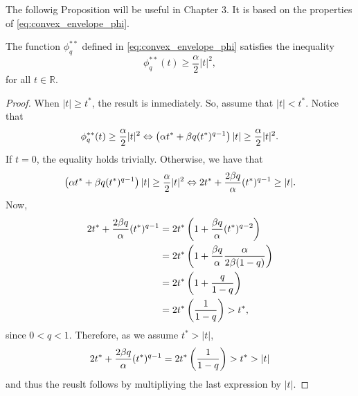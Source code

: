 The followig Proposition will be useful in Chapter 3. It is based on the properties of 
\eqref{eq:convex_envelope_phi}.
\begin{proposition}
    \label{prop:phi**_quadrature}
    The function $\phi_q^{**}$ defined in \eqref{eq:convex_envelope_phi} satisfies the inequality
    \[
    \phi_q^{**}(t)\ge \frac{\alpha}{2}|t|^2,
    \]
    for all $t\in \mathbb{R}$.
\end{proposition}
\begin{proof}
    When $|t|\ge t^*$, the result is inmediately. So, assume that $|t|<t^*$. Notice that
    \[
    \phi_{q}^{**}(t)\ge \frac{\alpha}{2}|t|^2\Leftrightarrow \left(\alpha t^*+\beta q (t^*)^{q-1}\right)|t|\ge \frac{\alpha}{2}|t|^2.
    \] 
    If $t=0$, the equality holds trivially. Otherwise, we have that
    \[
        \left(\alpha t^*+\beta q (t^*)^{q-1}\right)|t|\ge \frac{\alpha}{2}|t|^2\Leftrightarrow 2 t^*+\frac{2\beta q}{\alpha} (t^*)^{q-1}\ge |t|.
    \]
    Now,
    \begin{align*}
        2 t^*+\frac{2\beta q}{\alpha} (t^*)^{q-1}&=2t^*\left(1+\frac{\beta q}{\alpha}(t^{*})^{q-2}\right)\\
        &=2t^*\left(1+\frac{\beta q}{\alpha}\frac{\alpha}{2\beta (1-q)}\right)\\
        &=2t^*\left(1+\frac{q}{1-q}\right)\\
        &=2t^*\left(\frac{1}{1-q}\right)>t^*,\\
    \end{align*}
    since $0<q<1$. Therefore, as we assume $t^*>|t|$,
    $$
    2 t^*+\frac{2\beta q}{\alpha} (t^*)^{q-1}=2t^*\left(\frac{1}{1-q}\right)>t^*>|t|
    $$
    and thus the reuslt follows by multipliying the last expression by $|t|$.
\end{proof}

